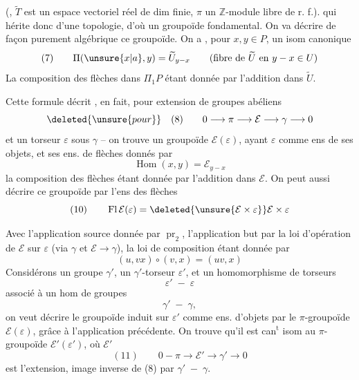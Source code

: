 (, $\widetilde T$ est un espace vectoriel réel de dim finie, $\pi$ un $\mathbb Z$-module libre de r. f.).  qui hérite donc d'une topologie, d'où un groupoïde fondamental. On va décrire de façon purement algébrique ce groupoïde. On a , pour $x,y\in P$, un isom  canonique
\[
(7)\qquad \Pi(\unsure{x|a},y)=\widetilde U_{y-x}
\qquad(\text{fibre de }\widetilde U\text{ en }y-x\in U)
\]
La composition des flèches dans $\Pi_1P$ étant donnée par l'addition dans $\widetilde U$.

 Cette formule décrit , en fait, pour  extension de groupes abéliens
\[
\deleted{\unsure{pour}}\quad(8)\qquad0\longrightarrow\pi\longrightarrow\mathcal E\longrightarrow\gamma\longrightarrow0
\]
et un torseur $\varepsilon$ sous $\gamma$ -- on trouve un \inserted{$\pi$-}groupoïde  $\mathcal E(\varepsilon)$, ayant $\varepsilon$ comme ens de ses objets, et ses ens. de flèches donnés par
\[
\operatorname{Hom}(x,y)=\mathcal E_{y-x}
\]
la composition des flèches étant donnée par l'addition dans $\mathcal E$. On peut aussi décrire ce groupoïde par l'ens des flèches
\[
(10)\qquad \operatorname{Fl}\mathcal E(\varepsilon)=\deleted{\unsure{\mathcal E\times\varepsilon}}\mathcal E\times\varepsilon
\]

Avec l'application source donnée par $\operatorname{pr}_2$, l'application but par la loi d'opération de $\mathcal E$ sur $\varepsilon$ (via $\gamma$ et $\mathcal E\longrightarrow\gamma$), la loi de composition étant donnée par
\[
(u,vx)\circ(v,x)=(uv,x)
\]
Considérons un groupe $\gamma'$, un  $\gamma'$-torseur $\varepsilon'$, et un homomorphisme de torseurs
\[
\varepsilon'\;-\;\varepsilon
\]
associé à un hom de groupes
\[
\gamma'\;-\;\gamma,
\]
on veut décrire le \inserted{$\pi$-}groupoïde induit sur $\varepsilon'$ comme ens. d'objets par le $\pi$-groupoïde $\mathcal E(\varepsilon)$, grâce à l'application précédente. On trouve qu'il est can$^{\mathrm t}$ isom au $\pi$-groupoïde $\mathcal E'(\varepsilon')$, où $\mathcal E'$
\[
(11)\qquad0-\pi\longrightarrow\mathcal E'\longrightarrow\gamma'\longrightarrow0
\]
est l'extension, image inverse de (8) par $\gamma'\;-\;\gamma$.

